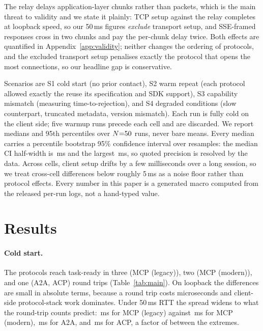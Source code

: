 \documentclass{article}
\newcommand{\mcpl}{MCP (legacy)}
\newcommand{\mcpm}{MCP (modern)}
\newcommand{\tabfont}{\footnotesize\setlength{\tabcolsep}{4pt}}
\begin{document}
The relay delays application-layer chunks rather than packets, which is the
main threat to validity and we state it plainly: TCP setup against the
relay completes at loopback speed, so our 50\,ms figures \emph{exclude}
transport setup, and SSE-framed responses cross in two chunks and pay the
per-chunk delay twice. Both effects are quantified in
Appendix~\ref{app:validity}; neither changes the ordering of protocols, and
the excluded transport setup penalises exactly the protocol that opens the
most connections, so our headline gap is conservative.

Scenarios are S1 cold start (no prior contact), S2 warm repeat (each
protocol allowed exactly the reuse its specification and SDK support), S3
capability mismatch (measuring time-to-rejection), and S4 degraded
conditions (slow counterpart, truncated metadata, version mismatch). Each
run is fully cold on the client side; five warmup runs precede each cell
and are discarded. We report medians and 95th percentiles over
$N{=}\NRuns{}$ runs, never bare means. Every median carries a percentile
bootstrap 95\% confidence interval over \CiIters{} resamples: the median CI
half-width is \CiMedHalfWidth{}\,ms and the largest \CiMaxHalfWidth{}\,ms,
so quoted precision is resolved by the data. Across cells, client setup
drifts by a few milliseconds over a long session, so we treat cross-cell
differences below roughly 5\,ms as a noise floor rather than protocol
effects. Every number in this paper is a generated macro computed from the
released per-run logs, not a hand-typed value.

\section{Results}
\label{sec:results}

\begin{table}[t]
\centering
\tabfont
\caption{Main results. Medians over $N{=}\NRuns{}$ runs per cell. RT =
application-layer round trips to task-ready (to rejection for S3); Conn =
TCP connections opened; wire bytes are relay-counted through task-ready
(localhost).}
\label{tab:main}

\end{table}

\paragraph{Cold start.}
The protocols reach task-ready in three (\mcpl{}), two (\mcpm{}), and one
(A2A, ACP) round trips (Table~\ref{tab:main}). On loopback the differences
are small in absolute terms, because a round trip costs microseconds and
client-side protocol-stack work dominates. Under 50\,ms RTT the spread
widens to what the round-trip counts predict:
\SOneMcpLegacyRttMed{}\,ms for \mcpl{} against \SOneMcpModernRttMed{}\,ms
for \mcpm{}, \SOneAtoaRttMed{}\,ms for A2A, and \SOneAcpRttMed{}\,ms for
ACP, a factor of \HeadlineColdRatio{} between the extremes.
\end{document}
